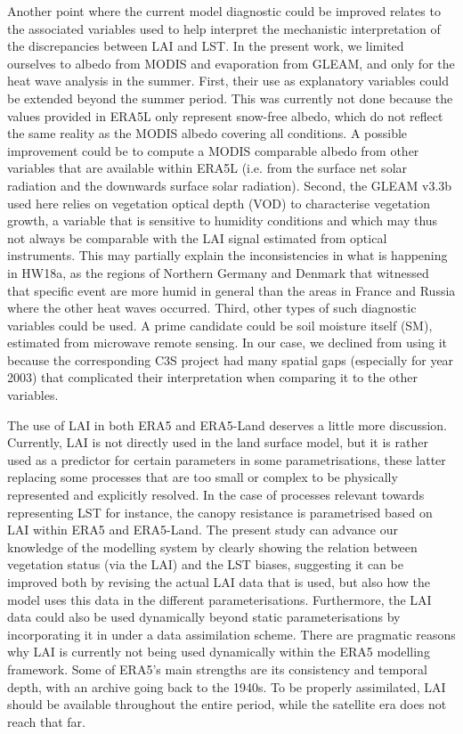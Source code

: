 \documentclass[gmd, manuscript]{copernicus}
\begin{document}
{Another point where the current model diagnostic could be improved
relates to the associated variables used to help interpret the
mechanistic interpretation of the discrepancies between LAI and LST. In
the present work, we limited ourselves to albedo from MODIS and
evaporation from GLEAM, and only for the heat wave analysis in the
summer. First, their use as explanatory variables could be extended
beyond the summer period. This was currently not done because the values
provided in ERA5L only represent snow-free albedo, which do not reflect
the same reality as the MODIS albedo covering all conditions. A possible 
improvement could be to compute a MODIS comparable albedo from other 
variables that are available within ERA5L (i.e. from the surface net solar 
radiation and the downwards surface solar radiation). Second,
the GLEAM v3.3b used here relies on vegetation optical depth (VOD) to
characterise vegetation growth, a variable that is sensitive to humidity
conditions and which may thus not always be comparable with the LAI
signal estimated from optical instruments. This may partially explain
the inconsistencies in what is happening in HW18a, as the regions of
Northern Germany and Denmark that witnessed that specific event are more
humid in general than the areas in France and Russia where the other
heat waves occurred. Third, other types of such diagnostic variables
could be used. A prime candidate could be soil moisture itself (SM),
estimated from microwave remote sensing. In our case, we declined from
using it because the corresponding C3S project had many spatial gaps
(especially for year 2003) that complicated their interpretation when
comparing it to the other variables.

The use of LAI in both ERA5 and ERA5-Land deserves a little 
more discussion. Currently, LAI is not directly used in the land surface 
model, but it is rather used as a predictor for certain parameters in 
some parametrisations, these latter replacing some processes that are 
too small or complex to be physically represented and explicitly resolved. 
In the case of processes relevant towards representing LST for instance, the 
canopy resistance is parametrised based on LAI within ERA5 and ERA5-Land. 
The present study can advance our knowledge of the modelling system by 
clearly showing the relation between vegetation status 
(via the LAI) and the LST biases, suggesting it can be improved both by revising 
the actual LAI data that is used, but also how the model uses this data in 
the different parameterisations. Furthermore, the LAI data could also be 
used dynamically beyond static parameterisations by incorporating it in 
under a data assimilation scheme. There are pragmatic reasons why LAI is 
currently not being used dynamically within the ERA5 modelling framework. Some 
of ERA5's main strengths are its consistency and temporal depth, with an archive 
going back to the 1940s. To be properly assimilated, LAI should be available 
throughout the entire period, while the satellite era does not reach that far.

}
\end{document}
